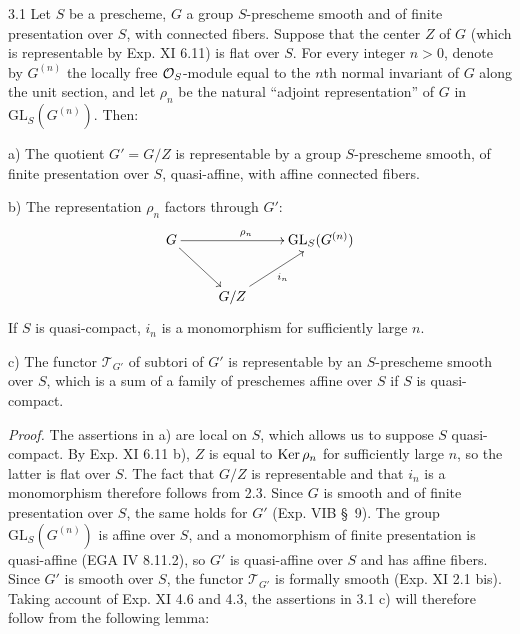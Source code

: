 \begin{proposition}{3.1}\label{XVI.3.1}
Let $S$ be a prescheme, $G$ a group $S$-prescheme smooth and of finite presentation over $S$, with connected fibers. Suppose that the center $Z$ of $G$ (which is representable by Exp. XI 6.11) is flat over $S$. For every integer $n>0$, denote by $G^{(n)}$ the locally free $\mathcal{O}_S$-module equal to the $n$th normal invariant of $G$ along the unit section, and let $\rho_n$ be the natural ``adjoint representation'' of $G$ in $\mathrm{GL}_S(G^{(n)})$. Then:

\noindent a) The quotient $G'=G/Z$ is representable by a group $S$-prescheme smooth, of finite presentation over $S$, quasi-affine, with affine connected fibers.

\noindent b) The representation $\rho_n$ factors through $G'$:
\[
\xymatrix{G\ar[rr]^{\rho_n}\ar[dr]&&\mathrm{GL}_S(G^{(n)})\\&G/Z\ar[ur]_{i_n}&}
\]
If $S$ is quasi-compact, $i_n$ is a monomorphism for sufficiently large $n$.

\noindent c) The functor $\mathscr T_{G'}$ of subtori of $G'$ is representable by an $S$-prescheme smooth over $S$, which is a sum of a family of preschemes affine over $S$ if $S$ is quasi-compact.
\end{proposition}
\par\noindent\emph{Proof.}
The assertions in a) are local on $S$, which allows us to suppose $S$ quasi-compact. By Exp. XI 6.11 b), $Z$ is equal to $\operatorname{Ker}\rho_n$ for sufficiently large $n$, so the latter is flat over $S$. The fact that $G/Z$ is representable and that $i_n$ is a monomorphism therefore follows from 2.3. Since $G$ is smooth and of finite presentation over $S$, the same holds for $G'$ (Exp. VIB \S\ 9). The group $\mathrm{GL}_S(G^{(n)})$ is affine over $S$, and a monomorphism of finite presentation is quasi-affine (EGA IV 8.11.2), so $G'$ is quasi-affine over $S$ and has affine fibers. Since $G'$ is smooth over $S$, the functor $\mathscr T_{G'}$ is formally smooth (Exp. XI 2.1 bis). Taking account of Exp. XI 4.6 and 4.3, the assertions in 3.1 c) will therefore follow from the following lemma:

